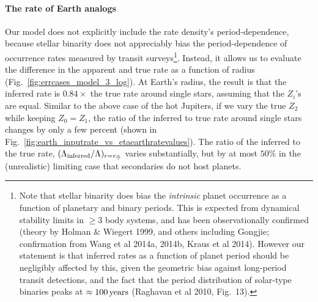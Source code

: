 \paragraph{The rate of Earth analogs}
Our model does not explicitly include the rate density's period-dependence, 
because stellar binarity does not appreciably bias the period-dependence of 
occurrence rates measured by transit surveys\footnote{
    Note that stellar binarity does bias the {\it intrinsic} planet 
    occurrence as a function of planetary and binary periods. This is expected 
    from dynamical stability limits in $\geq$3 body systems, and has been 
    observationally confirmed (theory by Holman \& Wiegert 1999, and others 
    including Gongjie; confirmation from Wang et al 2014a, 2014b, Kraus et al 
    2014). 
    However our statement is that inferred rates as a function of planet     
    period should be negligibly affected by this, given the geometric bias 
    against long-period transit detections, and the fact that the period 
    distribution of solar-type binaries peaks at $\approx 100\,{\rm years}$ 
    (Raghavan et al 2010, Fig.~13).
}.
Instead, it allows us to evaluate the difference in the apparent and true rate 
as a function of radius 
(Fig.~\ref{fig:errcases_model_3_log}).
At Earth's radius, the result is that the inferred rate is $0.84\times$ the 
true rate around single stars, assuming that the $Z_i$'s are equal.
Similar to the above case of the hot Jupiters, if we vary the true $Z_2$ 
while keeping $Z_0 = Z_1$, the ratio of the inferred to true rate 
around single stars changes by only a few percent (shown in 
Fig.~\ref{fig:earth_inputrate_vs_etaearthratevalues}).
The ratio of the inferred to the true rate, $(\Lambda_{\rm 
inferred}/\Lambda)_{r=r_\oplus}$ varies substantially, but by at most $50\%$ 
in the (unrealistic) limiting case that secondaries do not host planets.


